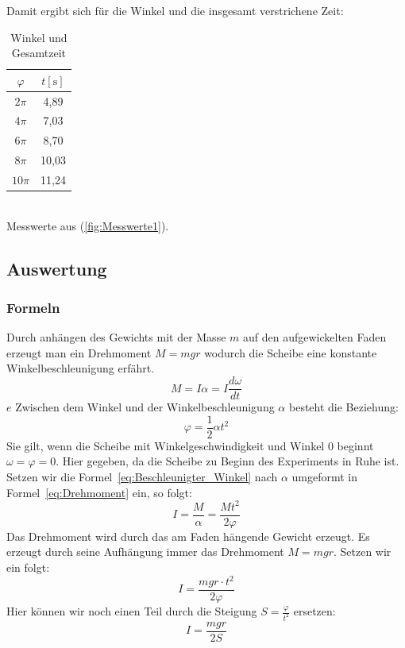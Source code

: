 \documentclass{article}
\begin{document}
				Damit ergibt sich für die Winkel und die insgesamt verstrichene Zeit:
				\begin{table}[!ht]
					\centering
					\begin{tabular}{ | c | c | } 
						\hline
						\( \varphi \) & \(t [\unit{\second}]\) \\
						\hline
						\( 2\pi \) & 4,89 \\
						\( 4\pi \) & 7,03 \\
						\( 6\pi \) & 8,70 \\
						\( 8\pi \) & 10,03 \\
						\( 10\pi \) & 11,24 \\
						\hline
					\end{tabular}
					\caption{\label{tab:Winkel_Gesamtzeit}Winkel und Gesamtzeit}
				\end{table} \\
				Messwerte aus (\ref{fig:Messwerte1}).

		\subsection{Auswertung}
			\subsubsection{Formeln}
			Durch anhängen des Gewichts mit der Masse \(m\) auf den aufgewickelten Faden erzeugt man ein Drehmoment \(M = mgr\) wodurch die Scheibe eine konstante Winkelbeschleunigung erfährt.
			\begin{equation} \label{eq:Drehmoment}
				M = I \alpha = I \frac{d\omega}{dt}
			\end{equation} \(e\)
			Zwischen dem Winkel und der Winkelbeschleunigung \( \alpha \) besteht die Beziehung:
			\begin{equation} \label{eq:Beschleunigter_Winkel}
				\varphi = \frac{1}{2} \alpha t^2
			\end{equation}
			Sie gilt, wenn die Scheibe mit Winkelgeschwindigkeit und Winkel 0 beginnt \(\omega = \varphi = 0\).
			Hier gegeben, da die Scheibe zu Beginn des Experiments in Ruhe ist.
			Setzen wir die Formel~\ref{eq:Beschleunigter_Winkel} nach \( \alpha \) umgeformt in Formel~\ref{eq:Drehmoment} ein, so folgt:
			\begin{equation}
				I = \frac{M}{\alpha} = \frac{ Mt^2 }{2 \varphi}
			\end{equation}
			Das Drehmoment wird durch das am Faden hängende Gewicht erzeugt. Es erzeugt durch seine Aufhängung immer das Drehmoment \( M = mgr \). Setzen wir ein folgt:
			\begin{equation}
				I = \frac{ m g r \cdot t^2 }{ 2 \varphi }
			\end{equation}
			Hier können wir noch einen Teil durch die Steigung \(S = \frac{ \varphi }{ t^2 } \) ersetzen:
			\begin{equation}\label{eq:Trägheitsmoment_komplett}
				I = \frac{mgr}{2S}
			\end{equation}
\end{document}
